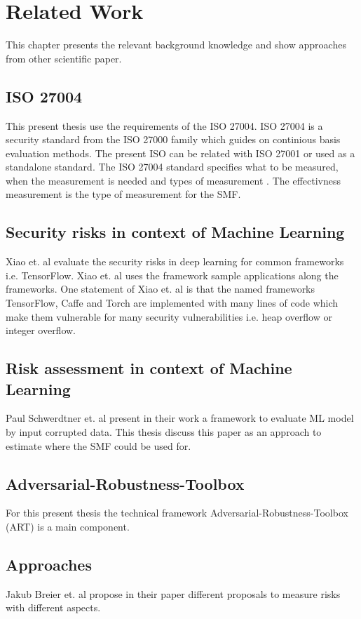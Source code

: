\section{Related Work}
\label{sec:relWork}

This chapter presents the relevant background knowledge and show approaches from other scientific paper.

\subsection{ISO 27004}

This present thesis use the requirements of the ISO 27004. ISO 27004 is a security standard from the ISO \cite{DBLP:conf/euspn/MeriahR19} 27000 family  which guides on continious basis evaluation methods. The present ISO can be related with ISO 27001 or used as a standalone standard. The ISO 27004 standard specifies what to be measured, when the measurement is needed and types of measurement \cite{lundholm2011design}. The effectivness measurement is the type of measurement for the SMF.

\subsection{Security risks in context of Machine Learning}

Xiao et. al \cite{DBLP:conf/sp/XiaoLZX18} evaluate the security risks in deep
learning for common frameworks i.e. TensorFlow. Xiao et. al uses the framework
sample applications along the frameworks. One statement of Xiao et. al is that the
named frameworks TensorFlow, Caffe and Torch are implemented with many lines of code
which make them vulnerable for many security vulnerabilities i.e. heap overflow or
integer overflow.

\subsection{Risk assessment in context of Machine Learning}

Paul Schwerdtner et. al \cite{DBLP:journals/corr/abs-2011-04328} present in their
work a framework to evaluate ML model by input corrupted data. This thesis discuss
this paper as an approach to estimate where the SMF could be used for.

\subsection{Adversarial-Robustness-Toolbox}

For this present thesis the technical framework Adversarial-Robustness-Toolbox (ART)
\cite{art2018} is a main component.

\subsection{Approaches}

Jakub Breier et. al \cite{DBLP:journals/corr/abs-2012-04884} propose in their paper
different proposals to measure risks with different aspects. \\
